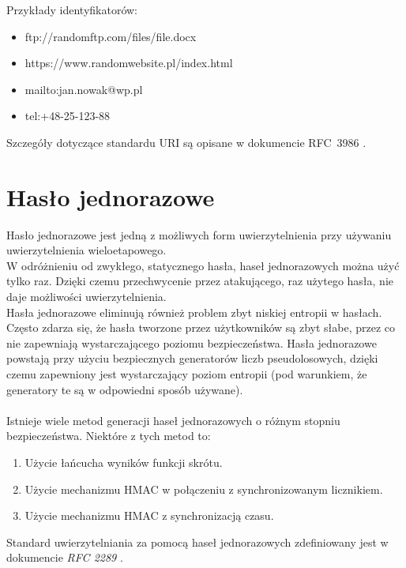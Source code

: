 Przykłady identyfikatorów:
\begin{itemize}
	\item ftp://randomftp.com/files/file.docx
	\item https://www.randomwebsite.pl/index.html
	\item mailto:jan.nowak@wp.pl
	\item tel:+48-25-123-88
\end{itemize}

Szczegóły dotyczące standardu URI są opisane w dokumencie RFC~3986 \cite{uri}. 

 
\section{Hasło jednorazowe}
Hasło jednorazowe jest jedną z możliwych form uwierzytelnienia przy używaniu uwierzytelnienia wieloetapowego. \\
W odróżnieniu od zwykłego, statycznego hasła, haseł jednorazowych można użyć tylko raz. 
Dzięki czemu przechwycenie przez atakującego, raz użytego hasła, nie daje możliwości uwierzytelnienia. \\
Hasła jednorazowe eliminują również problem zbyt niskiej entropii w hasłach. 
Często zdarza się, że hasła tworzone przez użytkowników są zbyt słabe, przez co nie zapewniają wystarczającego
poziomu bezpieczeństwa. Hasła jednorazowe powstają przy użyciu bezpiecznych generatorów liczb pseudolosowych, 
dzięki czemu zapewniony jest wystarczający poziom entropii (pod warunkiem, że generatory te są w odpowiedni 
sposób używane). \\ \\
Istnieje wiele metod generacji haseł jednorazowych o różnym stopniu bezpieczeństwa. 
Niektóre z tych metod to:
\begin{enumerate}
	\item Użycie łańcucha wyników funkcji skrótu.
	\item Użycie mechanizmu HMAC w połączeniu z synchronizowanym licznikiem.
	\item Użycie mechanizmu HMAC z synchronizacją czasu.
\end{enumerate}
Standard uwierzytelniania za pomocą haseł jednorazowych zdefiniowany jest w dokumencie \textit{RFC 2289} \cite{otprfc}.

